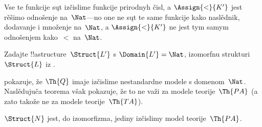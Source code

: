 \documentclass[../../../include/open-logic-section]{subfiles}
\begin{document}
\begin{ex}
Vse te funkcije sųt izčislime funkcije prirodnyh čisl, a
$\Assign{<}{K'}$ jest rěšimo odnošenje na~$\Nat$---no one ne sųt te
same funkcije kako naslědnik, dodavanje i množenje na~$\Nat$, a
$\Assign{<}{K'}$ ne jest tym samym odnošenjem kako~$<$ na~$\Nat$.
\end{ex}

\begin{prob}
Zadajte !!a{structure}~$\Struct{L'}$ s $\Domain{L'} = \Nat$, izomorfnu
strukturi~$\Struct{L}$ iz .
\end{prob}

\begin{explain}
 pokazuje, že $\Th{Q}$ imaje izčislime
nestandardne modele s domenom~$\Nat$. Naslědujuča teorema však
pokazuje, že to ne važi za modele teorije~$\Th{PA}$ (a zato takože ne
za modele teorije~$\Th{TA}$).
\end{explain}

\begin{thm}
$\Struct{N}$ jest, do izomorfizma, jediny izčislimy model
teorije~$\Th{PA}$.
\end{thm}
\end{document}
